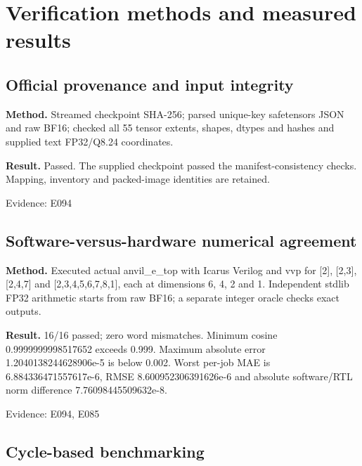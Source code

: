 \documentclass[11pt,a4paper]{article}
\begin{document}
\section{Verification methods and measured results}

\subsection{Official provenance and input integrity}

\textbf{Method.} Streamed checkpoint SHA-256; parsed unique-key safetensors JSON and raw BF16; checked all 55 tensor extents,\allowbreak{} shapes,\allowbreak{} dtypes and hashes and supplied text FP32/\allowbreak{}Q8.24 coordinates.

\textbf{Result.} Passed. The supplied checkpoint passed the manifest-consistency checks. Mapping,\allowbreak{} inventory and packed-image identities are retained.

{\small Evidence: E094}

\subsection{Software-versus-hardware numerical agreement}

\textbf{Method.} Executed actual anvil\_\allowbreak{}e\_\allowbreak{}top with Icarus Verilog and vvp for [\allowbreak{}2]\allowbreak{},\allowbreak{} [\allowbreak{}2,\allowbreak{}3]\allowbreak{},\allowbreak{} [\allowbreak{}2,\allowbreak{}4,\allowbreak{}7]\allowbreak{} and [\allowbreak{}2,\allowbreak{}3,\allowbreak{}4,\allowbreak{}5,\allowbreak{}6,\allowbreak{}7,\allowbreak{}8,\allowbreak{}1]\allowbreak{},\allowbreak{} each at dimensions 6,\allowbreak{} 4,\allowbreak{} 2 and 1. Independent stdlib FP32 arithmetic starts from raw BF16; a separate integer oracle checks exact outputs.

\textbf{Result.} 16/\allowbreak{}16 passed; zero word mismatches. Minimum cosine 0.9999999998517652 exceeds 0.999. Maximum absolute error 1.2040138244628906e-5 is below 0.002. Worst per-job MAE is 6.884336471557617e-6,\allowbreak{} RMSE 8.600952306391626e-6 and absolute software/\allowbreak{}RTL norm difference 7.76098445509632e-8.

{\small Evidence: E094,\allowbreak{} E085}

\subsection{Cycle-based benchmarking}
\end{document}

